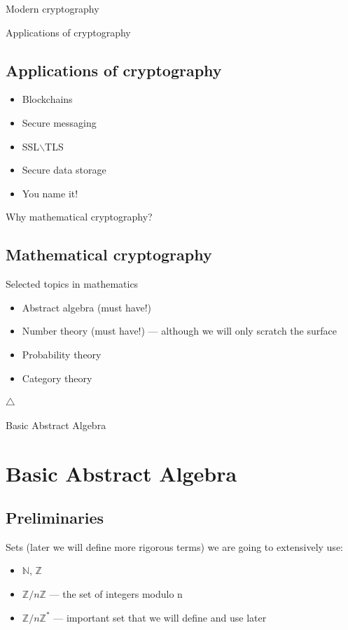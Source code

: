 \documentclass{beamer}
\begin{document}
\begin{frame}{Modern cryptography}
\begin{center}
\begin{minipage}{0.5\linewidth}
    \end{minipage}
    \end{center}
\end{frame}

\begin{frame}{Applications of cryptography}
    \subsection{Applications of cryptography}
    \begin{itemize}
        \item Blockchains
        \item Secure messaging
        \item SSL$\backslash$TLS
        \item Secure data storage
        \item You name it!
    \end{itemize}
\end{frame}

\begin{frame}{Why mathematical cryptography?}
    \subsection{Mathematical cryptography}
    Selected topics in mathematics
    \begin{itemize}
        \item Abstract algebra (must have!)
        \item Number theory (must have!) --- although we will only scratch the 
            surface
        \item Probability theory
        \item Category theory
    \end{itemize}
	$\triangle$
\end{frame}


\begin{frame}{Basic Abstract Algebra}
    \section{Basic Abstract Algebra}
    \subsection{Preliminaries}
    Sets (later we will define more rigorous terms) we are going to extensively 
        use:
    \begin{itemize}
        \item $\mathbb{N}$, $\mathbb{Z}$
        \item $\mathbb{Z} / n\mathbb{Z}$ --- the set of integers modulo n
        \item $\mathbb{Z} / n \mathbb{Z}^{*}$ --- important set that we will 
            define and use later
    \end{itemize} 
\end{frame}
\end{document}

